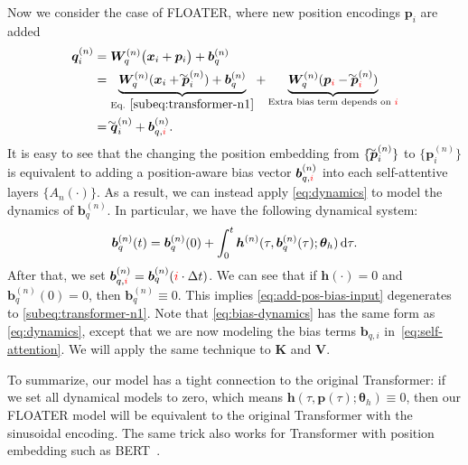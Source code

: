 \documentclass[11pt]{article}
\newcommand\wtil[1]{\ThisStyle{\setbox0=\hbox{$\SavedStyle#1$}\stackengine{-.1\LMpt}{$\SavedStyle#1$}{\stretchto{\scaleto{\SavedStyle\mkern.2mu\sim}{.5467\wd0}}{.7\ht0}
  }{O}{c}{F}{T}{S}}}
\def\vtheta{{\bm{\theta}}}
\def\vb{{\bm{b}}}
\def\vh{{\bm{h}}}
\def\vp{{\bm{p}}}
\def\vq{{\bm{q}}}
\def\vx{{\bm{x}}}
\def\mK{{\bm{K}}}
\def\mV{{\bm{V}}}
\def\mW{{\bm{W}}}
\begin{document}
Now we consider the case of FLOATER, where new position encodings $\vp_i$ are added
\begin{equation}
\label{eq:add-pos-bias-input}
\begin{aligned}
\vq_i^{(n)} &=\mW^{(n)}_{q}\big(\vx_i+\vp_i\big)+\vb^{(n)}_{q}\\
&=\underbrace{\mW^{(n)}_q(\vx_i+\wtil{\vp}^{(n)}_i)+\vb^{(n)}_q}_{\text{Eq. }\eqref{subeq:transformer-n1}}+\underbrace{\mW^{(n)}_{q}(\vp_{\textcolor{red}{i}}-\wtil{\vp}^{(n)}_{\textcolor{red}{i}})}_{\text{Extra bias term depends on $\color{red}i$}}\\
&=\wtil{\vq}^{(n)}_i+{\vb}^{(n)}_{q,\textcolor{red}{i}}.
\end{aligned}
\end{equation}
It is easy to see that the changing the position embedding from $\{\wtil{\vp}_i^{(n)}\}$ to $\{\vp_i^{(n)}\}$ is equivalent to adding a position-aware bias vector $\vb^{(n)}_{q, \textcolor{red}{i}}$ into each self-attentive layers $\{A_n(\cdot)\}$. As a result, we can instead apply \eqref{eq:dynamics} to model the dynamics of $\vb_q^{(n)}$. In particular, we have the following dynamical system:
\begin{equation}\label{eq:bias-dynamics}
    \vb_{q}^{(n)}(t)=\vb^{(n)}_{q}(0) + \int_0^t\vh^{(n)}(\tau, \vb^{(n)}_{q}({\tau}); \vtheta_h)\dif \tau.
\end{equation}
After that, we set $\vb^{(n)}_{q,\textcolor{red}{i}} = \vb^{(n)}_q(\textcolor{red}{i} \cdot \Delta t)$. 
We can see that if  $\vh(\cdot)=0$ and $\vb^{(n)}_{q}(0)=0$, then $\vb_q^{(n)}\equiv 0$. This implies \eqref{eq:add-pos-bias-input} degenerates to \eqref{subeq:transformer-n1}. 
Note that \eqref{eq:bias-dynamics} has the same form as \eqref{eq:dynamics}, except that we are now modeling the bias terms $\vb_{q,i}$ in~\eqref{eq:self-attention}. We will apply the same technique to $\mK$ and $\mV$.
\par
To summarize, our model has a tight connection to the original Transformer: if we set all dynamical models to zero, which means $\vh(\tau,\vp(\tau);\vtheta_h)\equiv 0$, then our FLOATER model will be equivalent to the original Transformer with the sinusoidal encoding. The same trick also works for Transformer with position embedding such as BERT~\cite{devlin2018bert}.
\par
\end{document}
